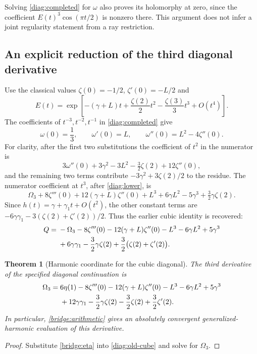 \documentclass[11pt]{article}
\numberwithin{equation}{section}
\newtheorem{theorem}{Theorem}[section]
\theoremstyle{definition}
\theoremstyle{remark}
\begin{document}
Solving \eqref{diag:completed} for $\omega$ also proves its
holomorphy at zero, since the coefficient $E(t)^3\cos(\pi t/2)$
is nonzero there. This argument does not infer a joint regularity
statement from a ray restriction.

\subsection{An explicit reduction of the third diagonal derivative}

Use the classical values $\zeta(0)=-1/2$, $\zeta'(0)=-L/2$ and
\[
 E(t)=\exp\left[-(\gamma+L)t+\frac{\zeta(2)}2t^2
                              -\frac{\zeta(3)}3t^3+O(t^4)\right].
\]
The coefficients of $t^{-3},t^{-2},t^{-1}$ in
\eqref{diag:completed} give
\begin{equation}\label{diag:lower}
 \omega(0)=\frac13,\qquad \omega'(0)=L,
 \qquad \omega''(0)=L^2-4\zeta''(0).
\end{equation}
For clarity, after the first two substitutions the coefficient of
$t^2$ in the numerator is
\[
 3\omega''(0)+3\gamma^2-3L^2-\tfrac32\zeta(2)+12\zeta''(0),
\]
and the remaining two terms contribute
$-3\gamma^2+3\zeta(2)/2$ to the residue.
The numerator coefficient at $t^3$, after \eqref{diag:lower}, is
\[
 \Omega_3+8\zeta'''(0)+12(\gamma+L)\zeta''(0)
 +L^3+6\gamma L^2-5\gamma^3+\tfrac32\gamma\zeta(2).
\]
Since $h(t)=\gamma+\gamma_1t+O(t^2)$, the other constant
terms are $-6\gamma\gamma_1-3(\zeta(2)+\zeta'(2))/2$.
Thus the earlier cubic identity is recovered:
\begin{align}
 Q={}&-\Omega_3-8\zeta'''(0)-12(\gamma+L)\zeta''(0)
            -L^3-6\gamma L^2+5\gamma^3\notag\\
 &+6\gamma\gamma_1-\frac32\gamma\zeta(2)
                       +\frac32\bigl(\zeta(2)+\zeta'(2)\bigr).
 \label{diag:old-cube}
\end{align}

\begin{theorem}[Harmonic coordinate for the cubic diagonal]
\label{thm:diag-harmonic}
The third derivative of the specified diagonal continuation is
\begin{align}
 \Omega_3={}&6\eta(1)-8\zeta'''(0)
 -12(\gamma+L)\zeta''(0)-L^3-6\gamma L^2+5\gamma^3\notag\\
 &+12\gamma\gamma_1-\frac32\gamma\zeta(2)
                     -\frac32\zeta(2)+\frac32\zeta'(2).
 \label{bridge:tornheim}
\end{align}
In particular, \eqref{bridge:arithmetic} gives an absolutely
convergent generalized-harmonic evaluation of this derivative.
\end{theorem}
\begin{proof}
Substitute \eqref{bridge:eta} into \eqref{diag:old-cube} and solve
for $\Omega_3$.
\end{proof}
\end{document}
